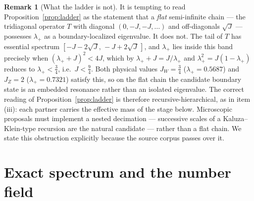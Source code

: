 \documentclass[11pt,a4paper]{article}
\theoremstyle{definition}
\newtheorem{remark}{Remark}
\begin{document}
\begin{remark}[What the ladder is not]
\label{rem:notchain}
It is tempting to read Proposition~\ref{prop:ladder} as the statement that
a \emph{flat} semi-infinite chain --- the tridiagonal operator $T$ with
diagonal $(0,-J,-J,\dots)$ and off-diagonals $\sqrt J$ --- possesses
$\lambda_+$ as a boundary-localized eigenvalue. It does not. The tail of
$T$ has essential spectrum $[-J-2\sqrt J,\,-J+2\sqrt J\,]$, and
$\lambda_+$ lies inside this band precisely when
$(\lambda_++J)^2<4J$, which by $\lambda_++J=J/\lambda_+$ and
$\lambda_+^2=J(1-\lambda_+)$ reduces to $\lambda_+<\tfrac34$, i.e.\
$J<\tfrac94$. Both physical values $J_W=\tfrac34$
($\lambda_+=0.5687$) and $J_Z=2$ ($\lambda_+=0.7321$) satisfy this, so on
the flat chain the candidate boundary state is an embedded resonance
rather than an isolated eigenvalue. The correct reading of
Proposition~\ref{prop:ladder} is therefore recursive-hierarchical, as in
item (iii): each partner carries the effective mass of the stage below.
Microscopic proposals must implement a nested decimation --- successive
scales of a Kaluza--Klein-type recursion are the natural candidate ---
rather than a flat chain. We state this obstruction explicitly because the
source corpus passes over it.
\end{remark}

\section{Exact spectrum and the number field}
\label{sec:spectrum}
\end{document}
